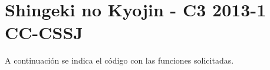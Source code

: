 \section{Shingeki no Kyojin - C3 2013-1 CC-CSSJ}
  A continuación se indica el código con las funciones
  solicitadas.
  
    